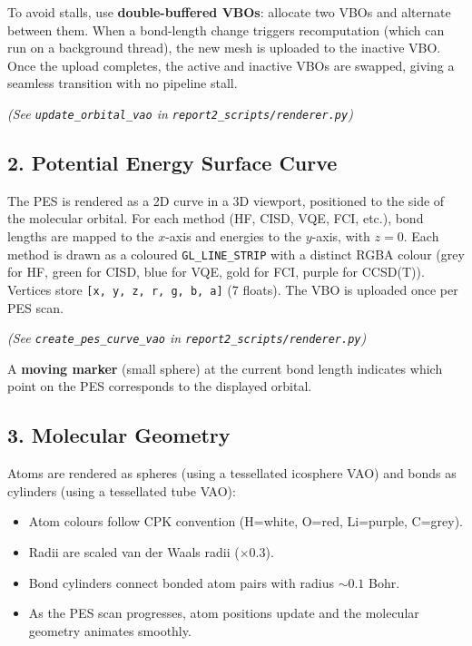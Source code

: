 \documentclass[
  11pt,
]{report}
\providecommand{\tightlist}{%
  \setlength{\itemsep}{0pt}\setlength{\parskip}{0pt}}
\begin{document}
To avoid stalls, use \textbf{double-buffered VBOs}: allocate two VBOs
and alternate between them. When a bond-length change triggers
recomputation (which can run on a background thread), the new mesh is
uploaded to the inactive VBO. Once the upload completes, the active and
inactive VBOs are swapped, giving a seamless transition with no pipeline
stall.

\emph{(See \texttt{update\_orbital\_vao} in
\texttt{report2\_scripts/renderer.py})}

\subsection{2. Potential Energy Surface
Curve}\label{potential-energy-surface-curve}

The PES is rendered as a 2D curve in a 3D viewport, positioned to the
side of the molecular orbital. For each method (HF, CISD, VQE, FCI,
etc.), bond lengths are mapped to the \(x\)-axis and energies to the
\(y\)-axis, with \(z = 0\). Each method is drawn as a coloured
\texttt{GL\_LINE\_STRIP} with a distinct RGBA colour (grey for HF, green
for CISD, blue for VQE, gold for FCI, purple for CCSD(T)). Vertices
store \texttt{{[}x,\ y,\ z,\ r,\ g,\ b,\ a{]}} (7 floats). The VBO is
uploaded once per PES scan.

\emph{(See \texttt{create\_pes\_curve\_vao} in
\texttt{report2\_scripts/renderer.py})}

A \textbf{moving marker} (small sphere) at the current bond length
indicates which point on the PES corresponds to the displayed orbital.

\subsection{3. Molecular Geometry}\label{molecular-geometry}

Atoms are rendered as spheres (using a tessellated icosphere VAO) and
bonds as cylinders (using a tessellated tube VAO):

\begin{itemize}
\tightlist
\item
  Atom colours follow CPK convention (H=white, O=red, Li=purple,
  C=grey).
\item
  Radii are scaled van der Waals radii (\(\times 0.3\)).
\item
  Bond cylinders connect bonded atom pairs with radius \(\sim 0.1\)
  Bohr.
\item
  As the PES scan progresses, atom positions update and the molecular
  geometry animates smoothly.
\end{itemize}
\end{document}
